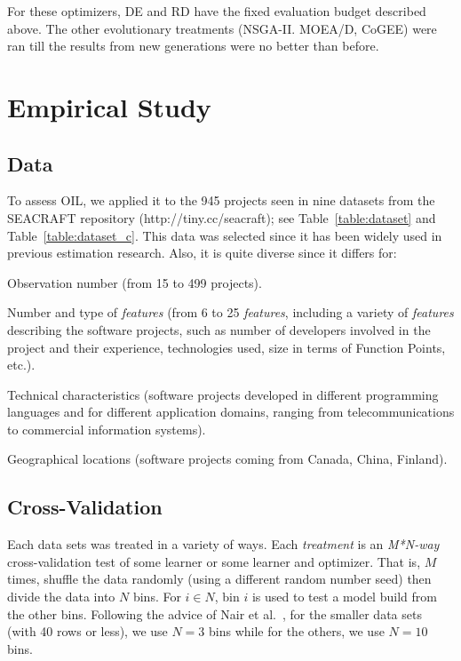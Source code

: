 For these optimizers, DE and RD have the fixed evaluation budget  described above.
The other evolutionary treatments       (NSGA-II. MOEA/D, CoGEE)  were ran
till  the results from new generations were no better than before.

\section{Empirical Study} \label{sect:study} 

\subsection{Data}



To assess OIL, we applied it to the 945 projects
seen in nine    datasets from the SEACRAFT repository (http://tiny.cc/seacraft); see Table~\ref{table:dataset} and Table~\ref{table:dataset_c}. 
This data was selected since it has been  widely  used in previous estimation research.
Also, it  is quite diverse since it differs for:
\bi
\item
Observation number (from 15 to 499 projects). 
\item
Number and type of {\em features} (from 6 to 25 {\em features}, including a variety of {\em features} describing the software projects, such as number of developers involved in the project and their experience, technologies used, size in terms of Function Points, etc.).
\item
Technical characteristics (software projects developed in different programming languages and for different application domains, ranging from telecommunications to commercial information systems).
\item
Geographical locations (software projects coming from Canada, China, Finland). 
\ei


\subsection{Cross-Validation}

Each data sets was treated in a variety of  ways. Each {\em treatment} is an {\em M*N-way} cross-validation test of some learner or some learner and optimizer. That is, $M$ times,  shuffle the data randomly (using a different random number seed)
then divide the data into $N$ bins.
For $i   \in N$, bin $i$ is used to test a model
build from the other bins.
Following the advice
of Nair et al.~\cite{nair18}, for the smaller data sets (with 40 rows or less), we  use $N=3$  bins
while for the others, we use $N=10$ bins.   

